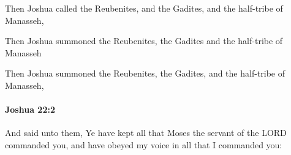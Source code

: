 			\begin{versebox}
					\item[BHS] 
					\item[ASV] Then Joshua called the Reubenites, and the Gadites, and the half-tribe of Manasseh,
					\item[NIV] Then Joshua summoned the Reubenites, the Gadites and the half-tribe of Manasseh
					\item[NRSV] Then Joshua summoned the Reubenites, the Gadites, and the half-tribe of Manasseh,
			\end{versebox}

		\paragraph{Joshua 22:2} %
			\label{JOSHUA-22-2}

			And said unto them, Ye have kept all that Moses the servant of the LORD commanded you, and have obeyed my voice in all that I commanded you:


